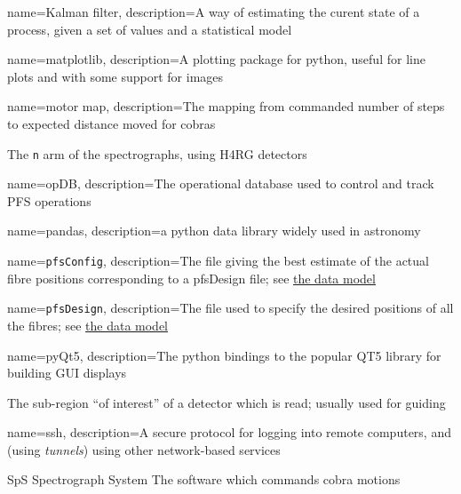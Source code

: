 {
   name={Kalman filter},
   description={A way of estimating the curent state of a process, given a set of values and
   a statistical model}
}


{
  name={matplotlib},
  description={A plotting package for python, useful for line plots and with some support for images}
}

{
  name={motor map},
  description={The mapping from commanded number of steps to expected distance moved for cobras}
}

{The \texttt{n} arm of the \PFS spectrographs, using \gls{H4RG} detectors}

{
  name={opDB},
  description={The operational database used to control and track \gls{PFS} operations}
}

{
  name={pandas},
  description={a python data library widely used in astronomy}
}

{
  name={\texttt{pfsConfig}},
  description={The file giving the best estimate of the actual fibre positions corresponding to
  a \gls{pfsDesign} file;
  see \href{https://github.com/Subaru-PFS/datamodel/blob/master/datamodel.txt}{the data model}}
}

{
  name={\texttt{pfsDesign}},
  description={The file used to specify the desired positions of all the fibres;
  see \href{https://github.com/Subaru-PFS/datamodel/blob/master/datamodel.txt}{the data model}}
}


{
  name={pyQt5},
  description={The python bindings to the popular QT5 library for building GUI displays}
}

{The sub-region ``of interest'' of a detector which is read;  usually used for guiding}


{
  name={ssh},
  description={A secure protocol for logging into remote computers, and (using \textit{tunnels})
    using other network-based services}
}

{SpS}
{Spectrograph System}
{The software which commands cobra motions}

